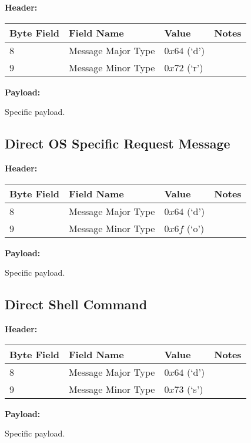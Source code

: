 \textbf{Header:}
\begin{center}
    \begin{tabular}{ | l | l | p{3cm} | p{5cm} |}
    \hline
    \hline
    \textbf{Byte Field} & \textbf{Field Name} & \textbf{Value} & \textbf{Notes} \\ \hline \hline
    8 & Message Major Type & $0x64$ (`d') &  \\    \hline
    9 & Message Minor Type & $0x72$ (`r') &  \\    \hline
    \end{tabular}
\end{center}
\noindent
\textbf{Payload:}
\begin{framed}
Specific payload.
\end{framed}

\subsection{Direct OS Specific Request Message}

\textbf{Header:}
\begin{center}
    \begin{tabular}{ | l | l | p{3cm} | p{5cm} |}
    \hline
    \hline
    \textbf{Byte Field} & \textbf{Field Name} & \textbf{Value} & \textbf{Notes} \\ \hline \hline
    8 & Message Major Type & $0x64$ (`d') &  \\    \hline
    9 & Message Minor Type & $0x6f$ (`o') &  \\    \hline
    \end{tabular}
\end{center}
\noindent
\textbf{Payload:}
\begin{framed}
Specific payload.
\end{framed}

\subsection{Direct Shell Command}

\textbf{Header:}
\begin{center}
    \begin{tabular}{ | l | l | p{3cm} | p{5cm} |}
    \hline
    \hline
    \textbf{Byte Field} & \textbf{Field Name} & \textbf{Value} & \textbf{Notes} \\ \hline \hline
    8 & Message Major Type & $0x64$ (`d') &  \\    \hline
    9 & Message Minor Type & $0x73$ (`s') &  \\    \hline
    \end{tabular}
\end{center}
\noindent
\textbf{Payload:}
\begin{framed}
Specific payload.
\end{framed}


